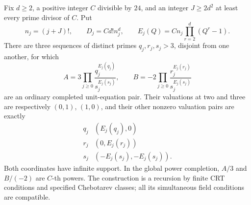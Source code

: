 \begin{theorem}
\label{thm:ghost-general-exponent-arithmetic}
Fix \(d\ge2\), a positive integer \(C\) divisible
by \(24\), and an integer \(J\ge2d^2\) at least
every prime divisor of \(C\). Put
\[
 n_j=(j+J)!,\qquad D_j=Cd!n_j^d,\qquad
 E_j(Q)=Cn_j\prod_{r=2}^d(Q^r-1).
 \tag{VX.6}
\]
There are three sequences of distinct primes
\(q_j,r_j,s_j>3\), disjoint from one another,
for which
\[
 A=3\prod_{j\ge0}\frac{q_j^{E_j(q_j)}}{s_j^{E_j(s_j)}},
 \qquad
 B=-2\prod_{j\ge0}\frac{r_j^{E_j(r_j)}}{s_j^{E_j(s_j)}}
 \tag{VX.7}
\]
are an ordinary completed unit-equation pair.
Their valuations at two and three are respectively
\((0,1)\), \((1,0)\), and their other nonzero
valuation pairs are exactly
\[
 \begin{array}{c|c}
 q_j&(E_j(q_j),0)\\
 r_j&(0,E_j(r_j))\\
 s_j&(-E_j(s_j),-E_j(s_j)).
 \end{array}
 \tag{VX.8}
\]
Both coordinates have infinite support. In the global
power completion, \(A/3\) and \(B/(-2)\) are
\(C\)-th powers. The construction is a recursion
by finite CRT conditions and specified Chebotarev
classes; all its simultaneous field conditions are
compatible.
\end{theorem}
